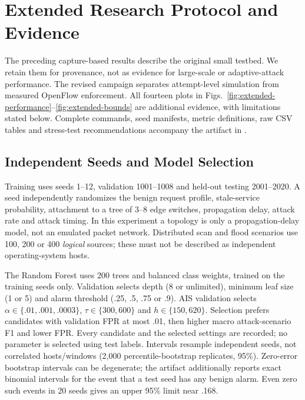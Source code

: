 \section{Extended Research Protocol and Evidence}\label{sec:extended}
The preceding capture-based results describe the original small testbed. We retain them for provenance, not as evidence
for large-scale or adaptive-attack performance. The revised campaign separates attempt-level simulation from measured
OpenFlow enforcement. All fourteen plots in Figs.~\ref{fig:extended-performance}--\ref{fig:extended-bounds}
are additional evidence, with limitations stated below. Complete commands, seed manifests, metric definitions, raw
CSV tables and stress-test recommendations accompany the artifact in .

\subsection{Independent Seeds and Model Selection}
Training uses seeds 1--12, validation 1001--1008 and held-out testing 2001--2020. A seed independently randomizes the
benign request profile, stale-service probability, attachment to a tree of 3--8 edge switches, propagation delay,
attack rate and attack timing. In this experiment a topology is only a propagation-delay model, not an emulated
packet network. Distributed scan and flood scenarios use 100, 200 or 400 \emph{logical} sources; these must not be
described as independent operating-system hosts.

The Random Forest uses 200 trees and balanced class weights, trained on the training seeds only. Validation selects
depth (8 or unlimited), minimum leaf size (1 or 5) and alarm threshold (.25, .5, .75 or .9). AIS validation selects
$\alpha\in\{.01,.001,.0003\}$, $\tau\in\{300,600\}$ and $h\in\{150,620\}$.
Selection prefers candidates with validation FPR at most .01, then higher macro attack-scenario F1 and lower FPR.
Every candidate and the selected settings are recorded; no parameter is selected using test labels.
Intervals resample independent seeds, not correlated hosts/windows (2,000 percentile-bootstrap replicates, 95\%).
Zero-error bootstrap intervals can be degenerate; the artifact additionally reports exact binomial intervals for
the event that a test seed has any benign alarm. Even zero such events in 20 seeds gives an upper 95\% limit near .168.

